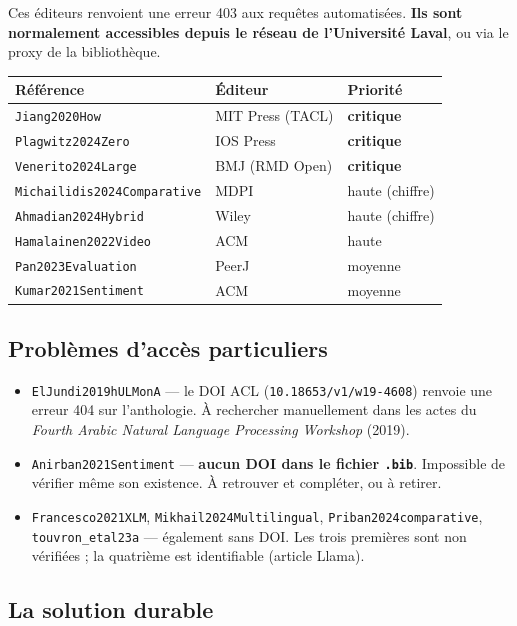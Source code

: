 \documentclass[11pt,a4paper]{article}
\newcommand{\cle}[1]{\texttt{\small #1}}
\begin{document}
Ces éditeurs renvoient une erreur 403 aux requêtes automatisées. \textbf{Ils
sont normalement accessibles depuis le réseau de l'Université Laval}, ou via
le proxy de la bibliothèque.

\begin{center}
\begin{tabular}{@{}p{4.4cm}p{4.6cm}p{4.8cm}@{}}
\toprule
\textbf{Référence} & \textbf{Éditeur} & \textbf{Priorité} \\
\midrule
\cle{Jiang2020How} & MIT Press (TACL) & \textbf{critique} \\
\cle{Plagwitz2024Zero} & IOS Press & \textbf{critique} \\
\cle{Venerito2024Large} & BMJ (RMD Open) & \textbf{critique} \\
\cle{Michailidis2024Comparative} & MDPI & haute (chiffre) \\
\cle{Ahmadian2024Hybrid} & Wiley & haute (chiffre) \\
\cle{Hamalainen2022Video} & ACM & haute \\
\cle{Pan2023Evaluation} & PeerJ & moyenne \\
\cle{Kumar2021Sentiment} & ACM & moyenne \\
\bottomrule
\end{tabular}
\end{center}

\subsection*{Problèmes d'accès particuliers}

\begin{itemize}
\item \cle{ElJundi2019hULMonA} --- le DOI ACL (\cle{10.18653/v1/w19-4608})
renvoie une erreur 404 sur l'anthologie. À rechercher manuellement dans les
actes du \emph{Fourth Arabic Natural Language Processing Workshop} (2019).
\item \cle{Anirban2021Sentiment} --- \textbf{aucun DOI dans le fichier
\cle{.bib}}. Impossible de vérifier même son existence. À retrouver et
compléter, ou à retirer.
\item \cle{Francesco2021XLM}, \cle{Mikhail2024Multilingual},
\cle{Priban2024comparative}, \cle{touvron\_etal23a} --- également sans DOI.
Les trois premières sont non vérifiées ; la quatrième est identifiable
(article Llama).
\end{itemize}

\subsection*{La solution durable}
\end{document}
